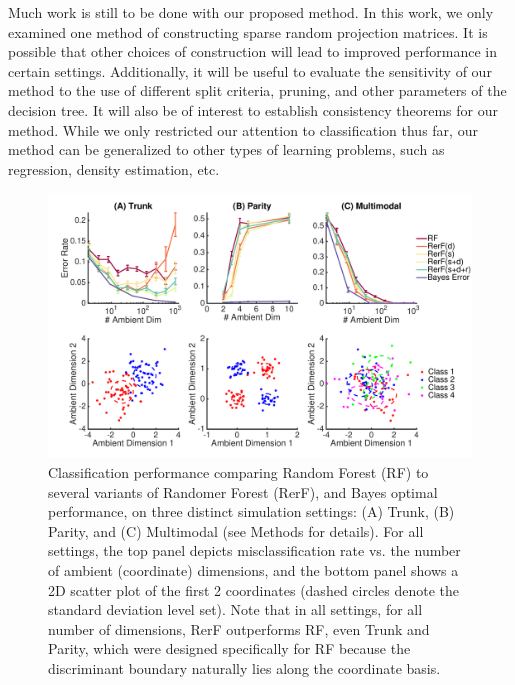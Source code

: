 \documentclass{article} %
\begin{document}
Much work is still to be done with our proposed method. In this work, we only examined one method of constructing sparse random projection matrices. It is possible that other choices of construction will lead to improved performance in certain settings. Additionally, it will be useful to evaluate the sensitivity of our method to the use of different split criteria, pruning, and other parameters of the decision tree. It will also be of interest to establish consistency theorems for our method. While we only restricted our attention to classification thus far, our method can be generalized to other types of learning problems, such as regression, density estimation, etc.

\begin{figure}[h]
\begin{center}
\includegraphics[trim=0in 0.4in 0in 0.4in, clip=true, width=\linewidth]{../Figures/pdf/Fig1_Lhat}
\end{center}
\caption{Classification performance comparing Random Forest (RF) to several variants of Randomer Forest (RerF), and Bayes optimal performance, on three distinct simulation settings: (A) Trunk, (B) Parity, and (C) Multimodal (see Methods for details).  For all settings, the top panel depicts misclassification rate vs. the number of ambient (coordinate) dimensions, and the bottom panel shows a 2D scatter plot of the first 2 coordinates (dashed circles denote the standard deviation level set).  Note that in all settings, for all number of dimensions, RerF outperforms RF, even Trunk and Parity, which were designed specifically for RF because the discriminant boundary naturally lies along the coordinate basis.}
\end{figure}
\end{document}
